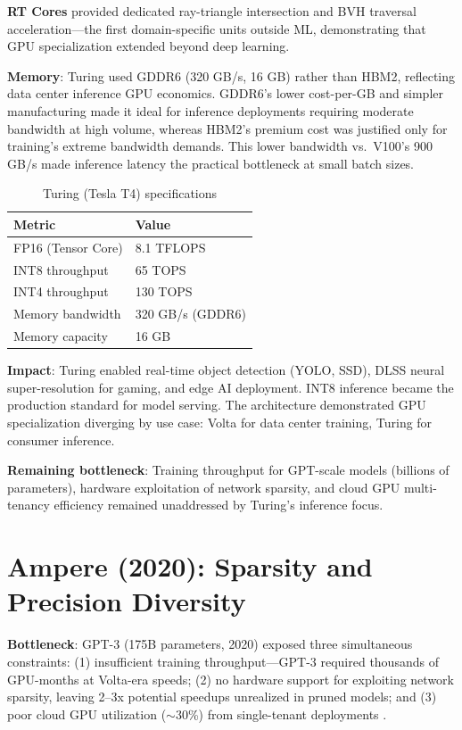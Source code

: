 \documentclass{article}
\begin{document}
\textbf{RT Cores} provided dedicated ray-triangle intersection and BVH traversal acceleration—the first domain-specific units outside ML, demonstrating that GPU specialization extended beyond deep learning.

\textbf{Memory}: Turing used GDDR6 (320 GB/s, 16 GB) rather than HBM2, reflecting data center inference GPU economics. GDDR6's lower cost-per-GB and simpler manufacturing made it ideal for inference deployments requiring moderate bandwidth at high volume, whereas HBM2's premium cost was justified only for training's extreme bandwidth demands. This lower bandwidth vs.\ V100's 900 GB/s made inference latency the practical bottleneck at small batch sizes.

\begin{table}[h]
\centering\small
\begin{tabular}{ll}
\toprule
Metric & Value \\
\midrule
FP16 (Tensor Core) & 8.1 TFLOPS \\
INT8 throughput & 65 TOPS \\
INT4 throughput & 130 TOPS \\
Memory bandwidth & 320 GB/s (GDDR6) \\
Memory capacity & 16 GB \\
\bottomrule
\end{tabular}
\caption{Turing (Tesla T4) specifications}
\end{table}

\textbf{Impact}: Turing enabled real-time object detection (YOLO, SSD), DLSS neural super-resolution for gaming, and edge AI deployment. INT8 inference became the production standard for model serving. The architecture demonstrated GPU specialization diverging by use case: Volta for data center training, Turing for consumer inference.

\textbf{Remaining bottleneck}: Training throughput for GPT-scale models (billions of parameters), hardware exploitation of network sparsity, and cloud GPU multi-tenancy efficiency remained unaddressed by Turing's inference focus.

\section{Ampere (2020): Sparsity and Precision Diversity}

\textbf{Bottleneck}: GPT-3 (175B parameters, 2020) \cite{brown2020language} exposed three simultaneous constraints: (1) insufficient training throughput—GPT-3 required thousands of GPU-months at Volta-era speeds; (2) no hardware support for exploiting network sparsity, leaving 2--3x potential speedups unrealized in pruned models; and (3) poor cloud GPU utilization ($\sim$30\%) from single-tenant deployments \cite{gpu_utilization_2020}.
\end{document}
